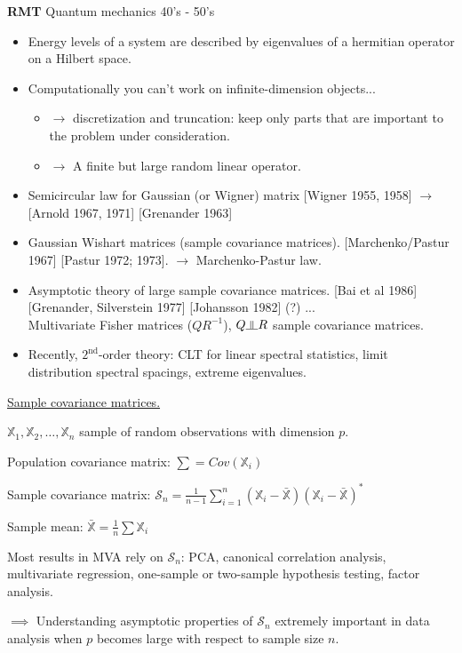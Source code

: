 \documentclass[twoside]{article}
\newcommand*\mean[1]{\bar{#1}}
\newcommand{\indep}{\rotatebox[origin=c]{90}{$\models$}}
\begin{document}
\textbf{RMT} Quantum mechanics 40's - 50's
\begin{itemize}
	\item Energy levels of a system are described by eigenvalues of a hermitian operator on a Hilbert space.
	\item Computationally you can't work on infinite-dimension objects...
	\begin{itemize}
		\item $\rightarrow$ discretization and truncation: keep only parts that are important to the problem under consideration.
		\item $\rightarrow$ A finite but large random linear operator.
	\end{itemize}
	\item Semicircular law for Gaussian (or Wigner) matrix [Wigner 1955, 1958] $\rightarrow$ [Arnold 1967, 1971] [Grenander 1963]
	\item Gaussian Wishart matrices (sample covariance matrices). [Marchenko/Pastur 1967] [Pastur 1972; 1973]. $\rightarrow$ Marchenko-Pastur law.
	\item Asymptotic theory of large sample covariance matrices. [Bai et al 1986] [Grenander, Silverstein 1977] [Johansson 1982] (?) ...\\
		Multivariate Fisher matrices ($QR^{-1}$), $Q\indep R$ sample covariance matrices.
	\item Recently, $2^{\text{nd}}$-order theory: CLT for linear spectral statistics, limit distribution spectral spacings, extreme eigenvalues.
\end{itemize}

\underline{Sample covariance matrices.}

$\mathbb{X}_1,\mathbb{X}_2,\dots,\mathbb{X}_n$ sample of random observations with dimension $p$.

Population covariance matrix: $\sum=Cov(\mathbb{X}_i)$

Sample covariance matrix: $\mathcal{S}_n=\frac1{n-1}\sum^n_{i=1}(\mathbb{X}_i-\mean{\mathbb{X}})(\mathbb{X}_i-\mean{\mathbb{X}})^*$

Sample mean: $\mean{\mathbb{X}}=\frac1n\sum\mathbb{X}_i$

Most results in MVA rely on $\mathcal{S}_n$: PCA, canonical correlation analysis, multivariate regression, one-sample or two-sample hypothesis testing, factor analysis.

$\implies$ Understanding asymptotic properties of $\mathcal{S}_n$ extremely important in data analysis when $p$ becomes large with respect to sample size $n$.
\end{document}
